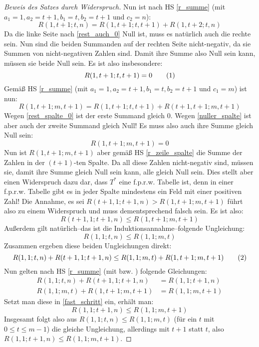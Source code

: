\begin{proof}[Beweis des Satzes durch Widerspruch]
    Nun ist nach HS \ref{r_summe} (mit $a_1=1, a_2=t+1, b_1=t, b_2=t+1$ und $c_2=n$):
    \[
        R(1, t+1; t, n)=R(1, t+1; t, t+1)+R(1, t+2; t, n)
    \]
    Da die linke Seite nach \eqref{rest_auch_0} Null ist, muss es natürlich auch die rechte sein. Nun sind die beiden 
    Summanden auf der rechten Seite nicht-negativ, da sie Summen von nicht-negativen Zahlen sind. Damit ihre Summe 
    also Null sein kann, müssen sie beide Null sein. Es ist also insbesondere:
    \[
        R(1, t+1; t, t+1)=0 \numberthis \label{rest_spalte_0}
    \]
    Gemäß HS \ref{r_summe} (mit $a_1=1, a_2=t+1, b_1=t, b_2=t+1$ und $c_1=m$) ist nun:
    \[
        R(1, t+1; m, t+1)=R(1, t+1; t, t+1)+R(t+1, t+1; m, t+1)
    \]
    Wegen \eqref{rest_spalte_0} ist der erste Summand gleich 0. Wegen \eqref{nuller_spalte} ist aber auch der zweite 
    Summand gleich Null! Es muss also auch ihre Summe gleich Null sein:
    \[
        R(1, t+1; m, t+1)=0
    \]
    Nun ist $R(1, t+1; m, t+1)$ aber gemäß HS \ref{r_zeile_spalte} die Summe der Zahlen in der $(t+1)$-ten Spalte. 
    Da all diese Zahlen nicht-negativ sind, müssen sie, damit ihre Summe gleich Null sein kann, alle gleich Null sein. 
    Dies stellt aber einen Widerspruch dazu dar, dass $T^*$ eine f.p.r.w. Tabelle ist, denn in einer f.p.r.w. Tabelle 
    gibt es in jeder Spalte mindestens ein Feld mit einer positiven Zahl! Die Annahme, es sei $R(t+1, 1; t+1, n)>
    R(1, t+1; m, t+1)$ führt also zu einem Widerspruch und muss dementsprechend falsch sein. Es ist also:
    \[
        R(t+1, 1; t+1, n)\leq R(1, t+1; m, t+1)
    \]
    Außerdem gilt natürlich--das ist die Induktionsannahme--folgende Ungleichung:
    \[
        R(1, 1; t, n)\leq R(1, 1; m, t)
    \]
    Zusammen ergeben diese beiden Ungleichungen direkt:
    \[
        R(1, 1; t, n)+R(t+1, 1; t+1, n)\leq R(1, 1; m, t)+R(1, t+1; m, t+1) \numberthis \label{fast_schritt}
    \]
    Nun gelten nach HS \ref{r_summe} (mit bzw. ) folgende Gleichungen:
    \begin{align*}
        R(1, 1; t, n)+R(t+1, 1; t+1, n)&=R(1, 1; t+1, n)\\
        R(1, 1; m, t)+R(1, t+1; m, t+1)&=R(1, 1; m, t+1)
    \end{align*}
    Setzt man diese in \eqref{fast_schritt} ein, erhält man:
    \[
        R(1, 1; t+1, n)\leq R(1, 1; m, t+1)
    \]
    Insgesamt folgt also aus $R(1, 1; t, n)\leq R(1, 1; m, t)$ (für ein $t$ mit $0\leq t\leq m-1$) die gleiche 
    Ungleichung, allerdings mit $t+1$ statt $t$, also $R(1, 1; t+1, n)\leq R(1, 1; m, t+1)$.


\end{proof}
